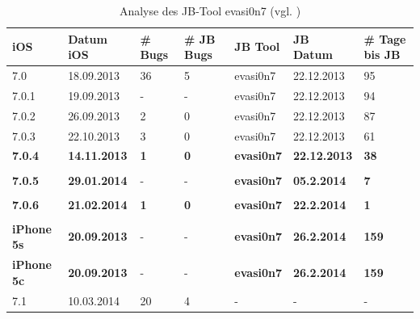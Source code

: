 \begin{table}[htp!]
    \begin{center}
        \begin{tabular}{| p{20mm} | p{22mm} | p{17mm} | p{25mm} | p{20mm} | p{22mm} | p{15mm} |} \hline
            \textbf{iOS} & \textbf{Datum iOS} & \textbf{\# Bugs} & \textbf{\# JB Bugs} & \textbf{JB Tool} & \textbf{JB Datum} & \textbf{\# Tage bis JB} \\ \hline 
7.0 & 18.09.2013 &	36 & 5 & evasi0n7 & 22.12.2013 & 95 \\ \hline
7.0.1 & 19.09.2013 & - & - & evasi0n7 & 22.12.2013 &  94 \\ \hline
7.0.2 & 26.09.2013 & 2 & 0 & evasi0n7 & 22.12.2013 & 87 \\ \hline
7.0.3 & 22.10.2013 & 3 & 0 & evasi0n7 & 22.12.2013 & 61\\ \hline
\textbf{7.0.4 }& \textbf{14.11.2013} & \textbf{1} & \textbf{0} & \textbf{evasi0n7 }& \textbf{22.12.2013} & \textbf{38} \\ \hline
 & & & & & & \\ \hline
\textbf{7.0.5} & \textbf{29.01.2014} & - & - & \textbf{evasi0n7} & \textbf{05.2.2014} & \textbf{7} \\ \hline
& & & & & & \\ \hline
\textbf{7.0.6} & \textbf{21.02.2014} & \textbf{1} & \textbf{0} & \textbf{evasi0n7} & \textbf{22.2.2014} & \textbf{1} \\ \hline
& & & & & & \\ \hline
\textbf{iPhone 5s} & \textbf{20.09.2013} & - & - & \textbf{evasi0n7 }& \textbf{26.2.2014} & \textbf{159} \\ \hline
\textbf{iPhone 5c} & \textbf{20.09.2013} & - & - & \textbf{evasi0n7 }& \textbf{26.2.2014} & \textbf{159} \\ \hline
7.1 & 10.03.2014 & 20 & 4 & - & - & - \\ \hline
        \end{tabular} 
        \caption{Analyse des JB-Tool evasi0n7 (vgl. \cite{Apple[7]}) \protect\footnotemark}
        \label{tab:Analyseevasi0n7}
    \end{center}
\end{table}

